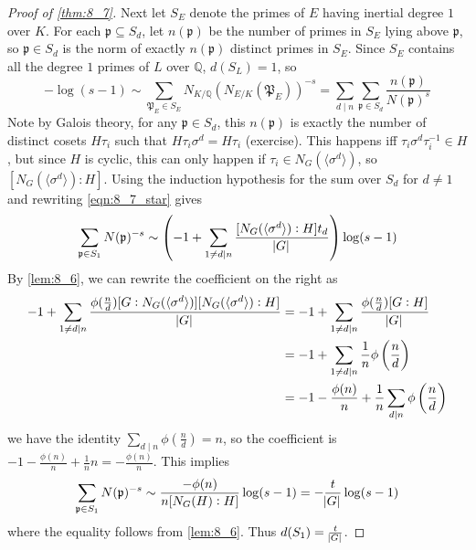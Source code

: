 \documentclass[11pt]{article}
\theoremstyle{definition}
\theoremstyle{plain}
\theoremstyle{remark}
\newcommand{\QQ}{\mathbb{Q}}
\newcommand{\cp}{\mathfrak{P}}
\newcommand{\fp}{\mathfrak{p}}
\begin{document}
\begin{proof}[Proof of \autoref{thm:8_7}]
    Next let $S_E$ denote the primes of $E$ having inertial degree $1$ over $K$. For each $\fp \subseteq S_d$, let $n(\fp)$ be the number of primes in $S_E$ lying above $\fp$, so $\fp \in S_d$ is the norm of exactly $n(\fp)$ distinct primes in $S_E$. Since $S_E$ contains all the degree $1$ primes of $L$ over $\QQ$, $d(S_L) = 1$, so
    \begin{equation}\label{eqn:8_7_star}
        -\log(s-1) \sim \sum_{\cp_E \in S_E} N_{K/\QQ}(N_{E/K}(\cp_E))^{-s} = \sum_{d \mid n} \sum_{\fp \in S_d} \frac{n(\fp)}{N(\fp)^s}
    \end{equation}
    Note by Galois theory, for any $\fp \in S_d$, this $n(\fp)$ is exactly the number of distinct cosets $H \tau_i$ such that $H \tau_i \sigma^d = H \tau_i$ (exercise). This happens iff $\tau_i \sigma^d \tau_i^{-1} \in H$, but since $H$ is cyclic, this can only happen if $\tau_i \in N_G(\langle \sigma^d \rangle)$, so $[N_G(\langle \sigma^d \rangle) : H]$. Using the induction hypothesis for the sum over $S_d$ for $d \neq 1$ and rewriting \eqref{eqn:8_7_star} gives
    \begin{equation*}
        [N_G(H) : H] \sum_{\fp \in S_1} N(\fp)^{-s} \sim \left(-1 + \sum_{1 \neq d \mid n} \frac{[N_G(\langle \sigma^d \rangle) : H] t_d}{\abs{G}}\right) \log(s-1)
    \end{equation*}
    By \autoref{lem:8_6}, we can rewrite the coefficient on the right as
    \begin{align*}
        -1 + \sum_{1 \neq d \mid n} \frac{\phi(\frac{n}{d}) [G : N_G(\langle \sigma^d \rangle)] [N_G(\langle \sigma^d \rangle) : H]}{\abs{G}}
        &= -1 + \sum_{1 \neq d \mid n} \frac{\phi(\frac{n}{d}) [G : H]}{\abs{G}}\\
        &= -1 + \sum_{1 \neq d \mid n} \frac{1}{n} \phi\left(\frac{n}{d}\right)\\
        &= -1 - \frac{\phi(n)}{n} + \frac{1}{n} \sum_{d \mid n} \phi\left(\frac{n}{d}\right)
    \end{align*}
    we have the identity $\sum_{d \mid n} \phi\left(\frac{n}{d}\right) = n$, so the coefficient is $-1 - \frac{\phi(n)}{n} + \frac{1}{n} n = - \frac{\phi(n)}{n}$. This implies
    \begin{equation*}
        \sum_{\fp \in S_1} N(\fp)^{-s} \sim \frac{-\phi(n)}{n [N_G(H) : H]} \log(s-1) = -\frac{t}{\abs{G}} \log(s-1)
    \end{equation*}
    where the equality follows from \autoref{lem:8_6}. Thus $d(S_1) = \frac{t}{\abs{G}}$.
\end{proof}
\end{document}
